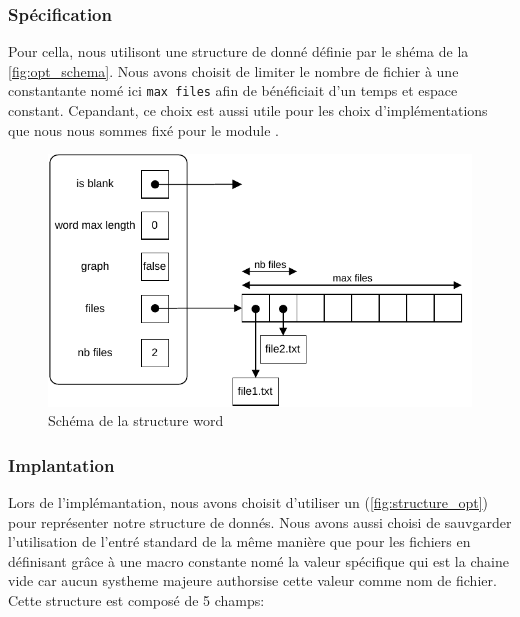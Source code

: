 \documentclass[a4paper, 12pt]{article}
\newcommand{\code}{\commandbox}
\begin{document}
\subsubsection{Spécification}

Pour cella, nous utilisont une structure de donné définie par le shéma de la \autoref{fig:opt_schema}. Nous avons choisit de limiter le nombre de fichier à une constantante nomé ici \texttt{max files} afin de bénéficiait d'un temps et espace constant. Cepandant, ce choix est aussi utile pour les choix d'implémentations que nous nous sommes fixé pour le module \code{jaccard}.

\begin{figure}[H]
    \centering
    \begin{tcolorbox}[enhanced,
        colback=white,
        colframe=codeblue,
        fonttitle=\bfseries,
        title=Schéma,
        boxrule=2pt,
        width=0.8\textwidth]
        \includegraphics[width=\textwidth]{opt_schema.pdf}
    \end{tcolorbox}
    \caption{Schéma de la structure word}
    \label{fig:opt_schema}
\end{figure}

\subsubsection{Implantation}

Lors de l'implémantation, nous avons choisit d'utiliser un \code{struct} (\autoref{fig:structure_opt}) pour représenter notre structure de donnés.
Nous avons aussi choisi de sauvgarder l'utilisation de l'entré standard de la même manière que pour les fichiers en définisant grâce à une macro constante nomé \code{STDIN} la valeur spécifique \code{""} qui est la chaine vide car aucun systheme majeure authorsise cette valeur comme nom de fichier. Cette structure est composé de 5 champs:
\end{document}
